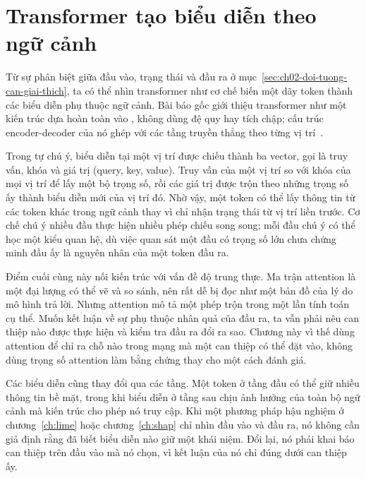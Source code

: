 \section{Transformer tạo biểu diễn theo ngữ cảnh}
\label{sec:ch02-transformer}

%
%
Từ sự phân biệt giữa đầu vào, trạng thái và đầu ra ở mục~\ref{sec:ch02-doi-tuong-can-giai-thich},
ta có thể nhìn transformer như cơ
chế biến một dãy token thành các biểu diễn phụ thuộc ngữ cảnh. Bài báo gốc
giới thiệu transformer như một kiến trúc dựa hoàn toàn vào
, không dùng đệ quy hay tích chập; cấu
trúc encoder-decoder của nó ghép  với các tầng
truyền thẳng theo từng vị trí~\autocite{p01attention}.

Trong tự chú ý, biểu diễn tại một vị trí được chiếu thành ba vector, gọi là
truy vấn, khóa và giá trị (query, key, value). Truy vấn của một vị trí so với
khóa của mọi vị trí để lấy một bộ trọng số, rồi các giá trị được trộn theo
những trọng số ấy thành biểu diễn mới của vị trí đó. Nhờ vậy, một token có thể lấy thông tin từ các token khác trong
ngữ cảnh thay vì chỉ nhận trạng thái từ vị trí liền trước. Cơ chế chú ý nhiều đầu
thực hiện nhiều phép chiếu song song; mỗi đầu chú ý có thể học một kiểu quan
hệ, dù việc quan sát một đầu có trọng số lớn chưa chứng minh đầu ấy là nguyên
nhân của một token đầu ra.

Điểm cuối cùng này nối kiến trúc với vấn đề độ trung thực. Ma trận attention
là một đại lượng có thể vẽ và so sánh, nên rất dễ bị đọc như một bản đồ của
lý do mô hình trả lời. Nhưng attention mô tả một phép trộn trong một lần tính
toán cụ thể. Muốn kết luận về sự phụ thuộc nhân quả của đầu ra, ta vẫn phải
nêu can thiệp nào được thực hiện và kiểm tra đầu ra đổi ra sao. Chương này vì
thế dùng attention để chỉ ra chỗ nào trong mạng mà một can thiệp có thể đặt
vào, không dùng trọng số attention làm bằng chứng thay cho một cách đánh giá.

Các biểu diễn cũng thay đổi qua các tầng. Một token ở tầng đầu có thể giữ
nhiều thông tin bề mặt, trong khi biểu diễn ở tầng sau chịu ảnh hưởng của toàn
bộ ngữ cảnh mà kiến trúc cho phép nó truy cập. Khi một phương pháp hậu nghiệm ở
chương~\ref{ch:lime} hoặc chương~\ref{ch:shap} chỉ nhìn đầu vào và đầu ra,
nó không cần giả định rằng đã biết biểu diễn nào giữ một khái niệm. Đổi lại,
nó phải khai báo can thiệp trên đầu vào mà nó chọn, vì kết luận của nó chỉ
đúng dưới can thiệp ấy.
%
